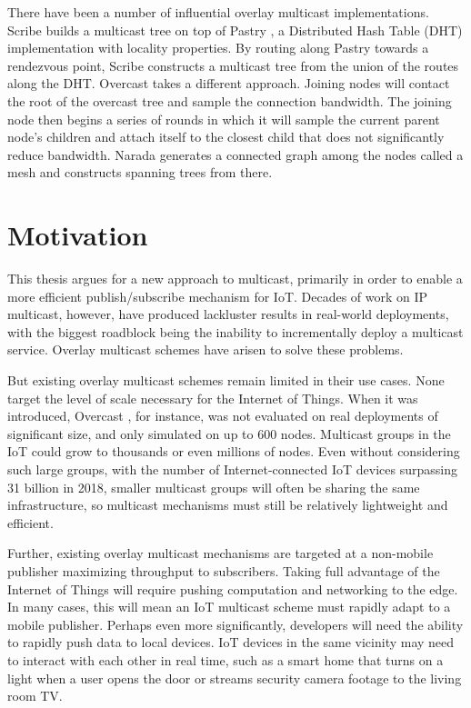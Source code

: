 There have been a number of influential overlay multicast implementations. Scribe \cite{scribe} builds a multicast tree on top of Pastry \cite{pastry}, a Distributed Hash Table (DHT) implementation with locality properties. By routing along Pastry towards a rendezvous point, Scribe constructs a multicast tree from the union of the routes along the DHT. Overcast \cite{overcast} takes a different approach. Joining nodes will contact the root of the overcast tree and sample the connection bandwidth. The joining node then begins a series of rounds in which it will sample the current parent node's children and attach itself to the closest child that does not significantly reduce bandwidth. Narada \cite{narada} generates a connected graph among the nodes called a mesh and constructs spanning trees from there.

\section{Motivation}
\label{motivation}
This thesis argues for a new approach to multicast, primarily in order to enable a more efficient publish/subscribe mechanism for IoT. Decades of work on IP multicast, however, have produced lackluster results in real-world deployments, with the biggest roadblock being the inability to incrementally deploy a multicast service. Overlay multicast schemes have arisen to solve these problems.

But existing overlay multicast schemes remain limited in their use cases. None target the level of scale necessary for the Internet of Things. When it was introduced, Overcast \cite{overcast}, for instance, was not evaluated on real deployments of significant size, and only simulated on up to 600 nodes. Multicast groups in the IoT could grow to thousands or even millions of nodes. Even without considering such large groups, with the number of Internet-connected IoT devices surpassing 31 billion \cite{ihs} in 2018, smaller multicast groups will often be sharing the same infrastructure, so multicast mechanisms must still be relatively lightweight and efficient.

Further, existing overlay multicast mechanisms are targeted at a non-mobile publisher maximizing throughput to subscribers. Taking full advantage of the Internet of Things will require pushing computation and networking to the edge. In many cases, this will mean an IoT multicast scheme must rapidly adapt to a mobile publisher. Perhaps even more significantly, developers will need the ability to rapidly push data to local devices. IoT devices in the same vicinity may need to interact with each other in real time, such as a smart home that turns on a light when a user opens the door or streams security camera footage to the living room TV. 

